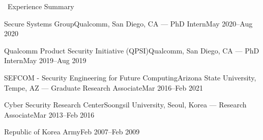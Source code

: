 \documentclass{resume} %
\begin{document}
\begin{rSection}{\faGenderless~Experience Summary}

    \begin{rSubsection2}
        {Secure Systems Group}{Qualcomm, San Diego, CA}
        {--- PhD Intern}{May 2020--Aug 2020}
    \end{rSubsection2}
    \vspace{-3mm}

    \begin{rSubsection2}
        {Qualcomm Product Security Initiative (QPSI)}{Qualcomm, San Diego, CA}
        {--- PhD Intern}{May 2019--Aug 2019}
    \end{rSubsection2}
    \vspace{-3mm}

    \begin{rSubsection2}
		{SEFCOM - {\small Security Engineering for Future Computing}}{Arizona State University, Tempe, AZ}
		{--- Graduate Research Associate}{Mar 2016--Feb 2021}
	\end{rSubsection2}
    \vspace{-3mm}

	\begin{rSubsection2}
		{Cyber Security Research Center}{Soongsil University, Seoul, Korea}
		{--- Research Associate}{Mar 2013--Feb 2016}
	\end{rSubsection2}
	\vspace{-3mm}

	\begin{rSubsection2}
		{Republic of Korea Army}{Feb 2007--Feb 2009}
		{}{}
	\end{rSubsection2}

\vspace{3mm}
\end{rSection}
\end{document}
